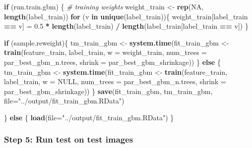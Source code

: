 \documentclass[
]{article}
\newenvironment{Shaded}{\begin{snugshade}}{\end{snugshade}}
\newcommand{\CommentTok}[1]{\textcolor[rgb]{0.56,0.35,0.01}{\textit{#1}}}
\newcommand{\ControlFlowTok}[1]{\textcolor[rgb]{0.13,0.29,0.53}{\textbf{#1}}}
\newcommand{\DataTypeTok}[1]{\textcolor[rgb]{0.13,0.29,0.53}{#1}}
\newcommand{\FloatTok}[1]{\textcolor[rgb]{0.00,0.00,0.81}{#1}}
\newcommand{\KeywordTok}[1]{\textcolor[rgb]{0.13,0.29,0.53}{\textbf{#1}}}
\newcommand{\NormalTok}[1]{#1}
\newcommand{\OperatorTok}[1]{\textcolor[rgb]{0.81,0.36,0.00}{\textbf{#1}}}
\newcommand{\OtherTok}[1]{\textcolor[rgb]{0.56,0.35,0.01}{#1}}
\newcommand{\StringTok}[1]{\textcolor[rgb]{0.31,0.60,0.02}{#1}}
\begin{document}
\begin{Shaded}
\begin{Highlighting}[]
\ControlFlowTok{if}\NormalTok{ (run.train.gbm) \{}
  \CommentTok{# training weights}
\NormalTok{  weight_train <-}\StringTok{ }\KeywordTok{rep}\NormalTok{(}\OtherTok{NA}\NormalTok{, }\KeywordTok{length}\NormalTok{(label_train))}
  \ControlFlowTok{for}\NormalTok{ (v }\ControlFlowTok{in} \KeywordTok{unique}\NormalTok{(label_train))\{}
\NormalTok{    weight_train[label_train }\OperatorTok{==}\StringTok{ }\NormalTok{v] =}\StringTok{ }\FloatTok{0.5} \OperatorTok{*}\StringTok{ }\KeywordTok{length}\NormalTok{(label_train) }\OperatorTok{/}\StringTok{ }\KeywordTok{length}\NormalTok{(label_train[label_train }\OperatorTok{==}\StringTok{ }\NormalTok{v])}
\NormalTok{  \}}
  
  \ControlFlowTok{if}\NormalTok{ (sample.reweight)\{}
\NormalTok{    tm_train_gbm <-}\StringTok{ }\KeywordTok{system.time}\NormalTok{(fit_train_gbm <-}\StringTok{ }\KeywordTok{train}\NormalTok{(feature_train, label_train, }\DataTypeTok{w =}\NormalTok{ weight_train, }
                                                       \DataTypeTok{num_trees =}\NormalTok{ par_best_gbm_n.trees, }
                                                       \DataTypeTok{shrink =}\NormalTok{ par_best_gbm_shrinkage))}
\NormalTok{  \} }\ControlFlowTok{else}\NormalTok{ \{}
\NormalTok{    tm_train_gbm <-}\StringTok{ }\KeywordTok{system.time}\NormalTok{(fit_train_gbm <-}\StringTok{ }\KeywordTok{train}\NormalTok{(feature_train, label_train, }\DataTypeTok{w =} \OtherTok{NULL}\NormalTok{, }
                                                       \DataTypeTok{num_trees =}\NormalTok{ par_best_gbm_n.trees,}
                                                       \DataTypeTok{shrink =}\NormalTok{ par_best_gbm_shrinkage))}
\NormalTok{  \}}
  \KeywordTok{save}\NormalTok{(fit_train_gbm, tm_train_gbm, }\DataTypeTok{file=}\StringTok{"../output/fit_train_gbm.RData"}\NormalTok{)}
  
\NormalTok{\} }\ControlFlowTok{else}\NormalTok{ \{}
  \KeywordTok{load}\NormalTok{(}\DataTypeTok{file=}\StringTok{"../output/fit_train_gbm.RData"}\NormalTok{)}
\NormalTok{\}}
\end{Highlighting}
\end{Shaded}

\hypertarget{step-5-run-test-on-test-images}{%
\subsubsection{Step 5: Run test on test
images}\label{step-5-run-test-on-test-images}}
\end{document}
